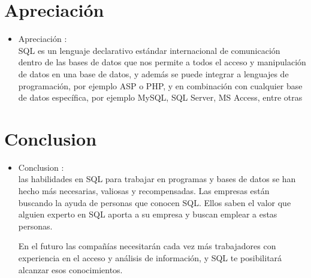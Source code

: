 \documentclass[preprint,12pt]{elsarticle}
\begin{document}
\section{Apreciación}
\begin{itemize}
\item Apreciación : \\

SQL es un lenguaje declarativo estándar internacional de comunicación dentro de las bases de datos que nos permite a todos el acceso y manipulación de datos en una base de datos, y además se puede integrar a lenguajes de programación, por ejemplo ASP o PHP, y en combinación con cualquier base de datos específica, por ejemplo MySQL, SQL Server, MS Access, entre otras

\end{itemize}
\section{Conclusion}
\begin{itemize}
\item Conclusion : \\

las habilidades en SQL para trabajar en programas y bases de datos se han hecho más necesarias, valiosas y recompensadas. Las empresas están buscando la ayuda de personas que conocen SQL. Ellos saben el valor que alguien experto en SQL aporta a su empresa y buscan emplear a estas personas.

En el futuro las compañías necesitarán cada vez más trabajadores con experiencia en el acceso y análisis de información, y SQL te posibilitará alcanzar esos conocimientos.


\end{itemize}
	
	

	
	\newpage
	
		 
\citep{referencia01}  
\citep{referencia02}  
\citep{referencia03}  
\citep{referencia04}  
\citep{referencia05} 
	
	
	
\end{document}
